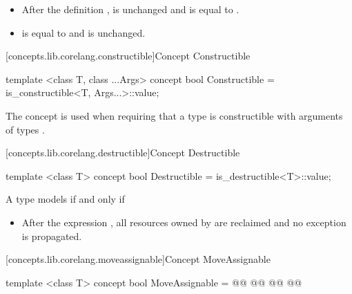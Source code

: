 \begin{addedblock}
\begin{itemdescr}
\begin{itemize}
\item After the definition ,  is unchanged and is equal
to .
\item {} is equal to  and  is unchanged.
\end{itemize}
\end{itemdescr}

[concepts.lib.corelang.constructible]{Concept Constructible}

%
\begin{itemdecl}
template <class T, class ...Args>
concept bool Constructible =
  is_constructible<T, Args...>::value;
\end{itemdecl}

\begin{itemdescr}
{\color{oldclr}
\pnum
The  concept is used when requiring that a type  is
constructible with arguments of types .
}
\end{itemdescr}

[concepts.lib.corelang.destructible]{Concept Destructible}

%
\begin{itemdecl}
template <class T>
concept bool Destructible =
  is_destructible<T>::value;
\end{itemdecl}

\begin{itemdescr}
\pnum
A type  models  if and only if

\begin{itemize}
\item After the expression , all resources owned by  are
reclaimed and no exception is propagated.
\end{itemize}
\end{itemdescr}

[concepts.lib.corelang.moveassignable]{Concept MoveAssignable}

%
\begin{itemdecl}
template <class T>
concept bool MoveAssignable =
  @@
  @@
    @@
  @\newtxt{\};}@
\end{itemdecl}


\end{addedblock}
